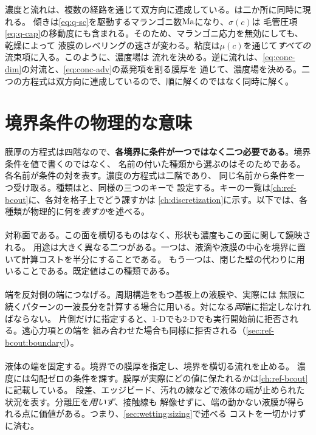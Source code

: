 濃度と流れは、複数の経路を通じて双方向に連成している。は二か所に同時に現れる。
傾きは\cref{eq:q-sc}を駆動するマランゴニ数$\mathrm{Ma}$になり、$\sigma(c)$は
毛管圧項\cref{eq:q-cap}の移動度にも含まれる。そのため、マランゴニ応力を無効にしても、乾燥によって
液膜のレベリングの速さが変わる。粘度は$\mu(c)$を通じて\emph{すべての}流束項に入る。このように、濃度場は
流れを決める。逆に流れは、\cref{eq:conc-dim}の対流と、\cref{eq:conc-adv}の蒸発項を割る膜厚を
通じて、濃度場を決める。二つの方程式は双方向に連成しているので、順に解くのではなく同時に解く。

\section{境界条件の物理的な意味}
\label{sec:conc:boundaries}

膜厚の方程式は四階なので、\textbf{各境界に条件が一つではなく二つ必要である}。境界条件を値で書くのではなく、
名前の付いた種類から選ぶのはそのためである。各名前が条件の対を表す。濃度の方程式は二階であり、
同じ名前から条件を一つ受け取る。種類はと、同様の三つのキーで
設定する。キーの一覧は\cref{ch:ref-bcout}に、各対を格子上でどう課すかは
\cref{ch:discretization}に示す。以下では、各種類が物理的に何を\emph{表すか}を述べる。

\paragraph{} 対称面である。この面を横切るものはなく、形状も濃度もこの面に関して鏡映される。
用途は大きく異なる二つがある。一つは、液滴や液膜の中心を境界に置いて計算コストを半分にすることである。
もう一つは、閉じた壁の代わりに用いることである。既定値はこの種類である。

\paragraph{} 端を反対側の端につなげる。周期構造をもつ基板上の液膜や、実際には
無限に続くパターンの一波長分を計算する場合に用いる。対になる\emph{両}端に指定しなければならない。
片側だけに指定すると、1-Dでも2-Dでも実行開始前に拒否される。遠心力項との端を
組み合わせた場合も同様に拒否される（\cref{sec:ref-bcout:boundary}）。

\paragraph{} 液体の端を固定する。境界での膜厚を指定し、境界を横切る流れを止める。
濃度には勾配ゼロの条件を課す。膜厚が実際にどの値に保たれるかは\cref{ch:ref-bcout}に記載している。
段差、エッジビード、汚れの線などで液体の端が止められた状況を表す。分離圧を\emph{用いず}、接触線も
解像せずに、端の動かない液膜が得られる点に価値がある。つまり、\cref{sec:wetting:sizing}で述べる
コストを一切かけずに済む。

